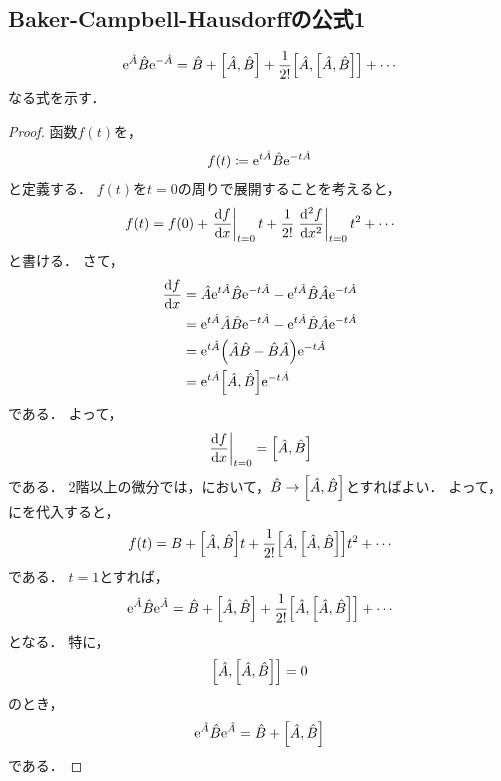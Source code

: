\documentclass{report}
\begin{document}
  \subsection{Baker-Campbell-Hausdorffの公式1}
    \begin{align}
      \mathrm{e}^{\hat{A}}\hat{B}\mathrm{e}^{-\hat{A}} = \hat{B} + \qty[\hat{A}, \hat{B}] + \frac{1}{2!}\qty[\hat{A}, \qty[\hat{A}, \hat{B}]] + \cdots
    \end{align}
    なる式を示す．
    \begin{proof}
      函数$f(t)$を，
      \begin{align}
        f(t) \coloneqq \mathrm{e}^{t\hat{A}}\hat{B}\mathrm{e}^{-t\hat{A}}
      \end{align}
      と定義する．
      $f(t)$を$t = 0$の周りで展開することを考えると，
      \begin{align}
        f(t) = f(0) + \eval{\dv{f}{x}}_{t = 0}t + \frac{1}{2!}\eval{\dv[2]{f}{x}}_{t = 0} t^2 + \cdots\label{taylor-bch}
      \end{align}
      と書ける．
      さて，
      \begin{align}
        \dv{f}{x} &= \hat{A}\mathrm{e}^{t\hat{A}}\hat{B}\mathrm{e}^{-t\hat{A}} - \mathrm{e}^{t\hat{A}}\hat{B}\hat{A}\mathrm{e}^{-t\hat{A}} \\ 
        &= \mathrm{e}^{t\hat{A}}\hat{A}\hat{B}\mathrm{e}^{-t\hat{A}} - \mathrm{e}^{t\hat{A}}\hat{B}\hat{A}\mathrm{e}^{-t\hat{A}} \\ 
        &= \mathrm{e}^{t\hat{A}}\qty(\hat{A}\hat{B} - \hat{B}\hat{A})\mathrm{e}^{-t\hat{A}} \\ 
        &= \mathrm{e}^{t\hat{A}}\qty[\hat{A}, \hat{B}]\mathrm{e}^{-t\hat{A}}\label{1st-diff-bch}
      \end{align}
      である．
      よって，
      \begin{align}
        \eval{\dv{f}{x}}_{t = 0} = \qty[\hat{A}, \hat{B}]
      \end{align}
      である．
      2階以上の微分では，において，$\hat{B} \to \qty[\hat{A}, \hat{B}]$とすればよい．
      よって，にを代入すると，
      \begin{align}
        f(t) = B + \qty[\hat{A}, \hat{B}]t + \frac{1}{2!}\qty[\hat{A}, \qty[\hat{A}, \hat{B}]]t^2 + \cdots
      \end{align}
      である．
      $t = 1$とすれば，
      \begin{align}
        \mathrm{e}^{\hat{A}}\hat{B}\mathrm{e}^{\hat{A}} = \hat{B} + \qty[\hat{A}, \hat{B}] + \frac{1}{2!}\qty[\hat{A}, \qty[\hat{A}, \hat{B}]] + \cdots
      \end{align}
      となる．
      特に，
      \begin{align}
        \qty[\hat{A}, \qty[\hat{A}, \hat{B}]] = 0
      \end{align}
      のとき，
      \begin{align}
        \mathrm{e}^{\hat{A}}\hat{B}\mathrm{e}^{\hat{A}} = \hat{B} + \qty[\hat{A}, \hat{B}]
      \end{align}
      である．
    \end{proof}
\end{document}
